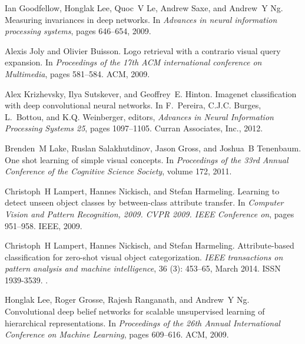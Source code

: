 \documentclass{bmvc2k}
\begin{document}
\begin{thebibliography}{23}
Ian Goodfellow, Honglak Lee, Quoc~V Le, Andrew Saxe, and Andrew~Y Ng.
\newblock Measuring invariances in deep networks.
\newblock In \emph{Advances in neural information processing systems}, pages
  646--654, 2009.

Alexis Joly and Olivier Buisson.
\newblock Logo retrieval with a contrario visual query expansion.
\newblock In \emph{Proceedings of the 17th ACM international conference on
  Multimedia}, pages 581--584. ACM, 2009.

Alex Krizhevsky, Ilya Sutskever, and Geoffrey~E. Hinton.
\newblock Imagenet classification with deep convolutional neural networks.
\newblock In F.~Pereira, C.J.C. Burges, L.~Bottou, and K.Q. Weinberger,
  editors, \emph{Advances in Neural Information Processing Systems 25}, pages
  1097--1105. Curran Associates, Inc., 2012.

Brenden~M Lake, Ruslan Salakhutdinov, Jason Gross, and Joshua~B Tenenbaum.
\newblock One shot learning of simple visual concepts.
\newblock In \emph{Proceedings of the 33rd Annual Conference of the Cognitive
  Science Society}, volume 172, 2011.

Christoph~H Lampert, Hannes Nickisch, and Stefan Harmeling.
\newblock Learning to detect unseen object classes by between-class attribute
  transfer.
\newblock In \emph{Computer Vision and Pattern Recognition, 2009. CVPR 2009.
  IEEE Conference on}, pages 951--958. IEEE, 2009.

Christoph~H Lampert, Hannes Nickisch, and Stefan Harmeling.
\newblock Attribute-based classification for zero-shot visual object
  categorization.
\newblock \emph{IEEE transactions on pattern analysis and machine
  intelligence}, 36 (3): 453--65, March 2014.
\newblock ISSN 1939-3539.
\newblock {}.

Honglak Lee, Roger Grosse, Rajesh Ranganath, and Andrew~Y Ng.
\newblock Convolutional deep belief networks for scalable unsupervised learning
  of hierarchical representations.
\newblock In \emph{Proceedings of the 26th Annual International Conference on
  Machine Learning}, pages 609--616. ACM, 2009.


\end{thebibliography}
\end{document}
